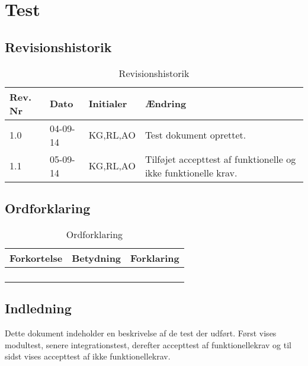 \chapter{Test}

\section{Revisionshistorik}

\begin{table}[H]
	\centering
		\begin{tabular}{|p{2 cm}|p{2 cm}|p{3 cm}|p{6 cm}|} 
		\hline
			Rev. Nr & Dato		& Initialer 	& Ændring \\ \hline
			1.0 	& 04-09-14	& KG,RL,AO		& Test dokument oprettet.	\\ \hline
			1.1 	& 05-09-14	& KG,RL,AO		& Tilføjet accepttest af funktionelle og ikke funktionelle krav.\\ \hline
		\end{tabular}
	\caption{Revisionshistorik}
\end{table}

\section{Ordforklaring}


\begin{table}[H]
	\centering
		\begin{tabular}{|p{4.5cm}|p{4.5 cm}|p{4.5 cm}|}  
		\hline
			Forkortelse & Betydning & Forklaring \\ \hline
			& & \\ \hline
			& & \\ \hline
			& & \\ \hline
			& & \\ \hline
		\end{tabular}
	\caption{Ordforklaring}
\end{table}


\section{Indledning}

Dette dokument indeholder en beskrivelse af de test der udført. Først vises modultest, senere integrationstest, derefter accepttest af funktionellekrav og til sidst vises accepttest af ikke funktionellekrav.